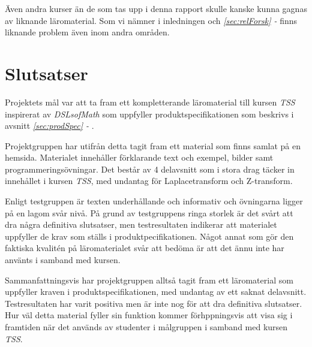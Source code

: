 \documentclass[12pt,a4paper,twoside,openright]{article}
\begin{document}
Även andra kurser än de som tas upp i denna rapport skulle kanske
kunna gagnas av liknande läromaterial. Som vi nämner i
inledningen och \textit{\ref{sec:relForsk} - }
finns liknande problem även inom andra områden.


\section{Slutsatser}

Projektets mål var att ta fram ett kompletterande läromaterial till
kursen \textit{TSS} inspirerat av \textit{DSLsofMath} som uppfyller
produktspecifikationen som beskrivs i avsnitt \textit{\ref{sec:prodSpec} - }.

Projektgruppen har utifrån detta tagit fram ett material som finns
samlat på en hemsida. Materialet innehåller förklarande text och exempel, bilder
samt programmeringsövningar. Det består av 4 delavsnitt
som i stora drag täcker in innehållet i kursen \textit{TSS}, med
undantag för Laplacetransform och Z-transform.

Enligt testgruppen är texten underhållande och informativ och
övningarna ligger på en lagom svår nivå. På grund av testgruppens
ringa storlek är det svårt att dra några definitiva slutsatser,
men testresultaten indikerar att materialet uppfyller de krav
som ställs i produktpecifikationen. Något annat som gör den faktiska kvalitén på
läromaterialet svår att bedöma är att det
ännu inte har använts i samband med kursen.

Sammanfattningsvis har projektgruppen alltså tagit
fram ett läromaterial som uppfyller kraven i produktspecifikationen,
med undantag av ett saknat delavsnitt. Testresultaten har varit
positiva men är inte nog för att dra definitiva slutsatser. Hur väl detta
material fyller sin funktion kommer förhppningsvis att
visa sig i framtiden när det används av studenter i målgruppen i samband med
kursen \textit{TSS}.

\newpage





\newpage

\appendix
\end{document}

